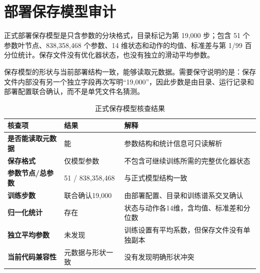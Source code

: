 
\section{部署保存模型审计}

正式部署保存模型是只含参数的分块格式，目录标记为第 19,000 步；包含 51 个参数叶节点、838,358,468 个参数、14 维状态和动作的均值、标准差与第 1/99 百分位统计。保存文件没有优化器状态，也没有独立的滑动平均参数。

保存模型的形状与当前部署结构一致，能够读取元数据。需要保守说明的是：保存文件内部没有另一个独立字段再次写明“19,000”，因此步数是由目录、运行记录和部署配置联合确认，而不是单凭文件名猜测。

\begin{table}[H]
\centering
\caption{正式保存模型核查结果}
\begin{tabularx}{\textwidth}{>{\bfseries}p{41mm}p{31mm}X}
\toprule
核查项 & 结果 & 解释\\
\midrule
是否能读取元数据 & 能 & 参数结构和统计信息可只读解析\\
保存格式 & 仅模型参数 & 不包含可继续训练所需的完整优化器状态\\
参数节点/总参数 & 51 / 838,358,468 & 与正式模型结构一致\\
训练步数 & 联合确认19,000 & 由部署配置、目录和训练谱系交叉确认\\
归一化统计 & 存在 & 状态与动作各14维，含均值、标准差和分位数\\
独立平均参数 & 未发现 & 训练设置有平均系数，但保存文件没有单独副本\\
当前代码兼容性 & 元数据与形状一致 & 没有发现明确形状冲突\\
\bottomrule
\end{tabularx}
\end{table}
